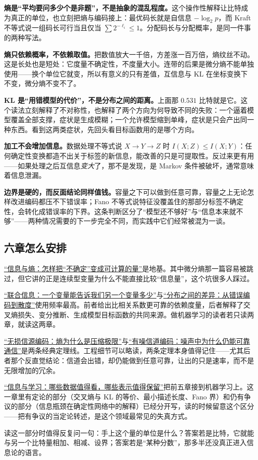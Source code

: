 \textbf{熵是``平均要问多少个是非题''，不是抽象的混乱程度。}这个操作性解释让比特成为真正的单位，也立刻把熵与编码接上：最优码长就是自信息 \(-\log_2p\)，而 Kraft 不等式说一组码长可行当且仅当 \(\sum2^{-\ell_i}\le1\)。分配码长与分配概率，是同一件事的两种写法。

\textbf{熵只依赖概率，不依赖取值。}把数值放大一千倍，方差涨一百万倍，熵纹丝不动。这是长处也是短处：它度量不确定性，不度量大小。连带的后果是微分熵不能单独使用——换个单位它就变，所以有意义的只有差值，互信息与 KL 在坐标变换下不变，微分熵不变不了。

\textbf{KL 是``用错模型的代价''，不是分布之间的距离。}上面那 \(0.531\) 比特就是它。这个读法立刻解释了不对称性，也解释了两个方向为何导致不同的失败：一个逼着模型覆盖全部支撑，症状是生成模糊；一个允许模型缩到单峰，症状是只会产出同一种东西。看到这两类症状，先回头看目标函数用的是哪个方向。

\textbf{加工不会增加信息。}数据处理不等式说 \(X\to Y\to Z\) 时 \(I(X;Z)\le I(X;Y)\)：任何确定性变换都造不出关于标签的新信息，能改善的只是可提取性。反过来更有用——如果处理之后互信息\emph{变大}了，那不是发现，是 Markov 条件被破坏，通常意味着信息泄漏。

\textbf{边界是硬的，而反面结论同样值钱。}容量之下可以做到任意可靠，容量之上无论怎样改进编码都压不下错误率；Fano 不等式说特征没覆盖住的那部分标签不确定性，会转化成错误率的下界。这条判断区分了``模型还不够好''与``信息本来就不够''——两种情况需要的下一步完全不同，而实践中它们经常被混为一谈。

\subsection{六章怎么安排}

\hyperref[ch:054]{``信息与熵：怎样把``不确定''变成可计算的量''}是地基。其中微分熵那一篇容易被跳过，但它讲的正是连续型变量为什么不能直接比较``信息量''，这个坑很多人踩过。

\hyperref[ch:055]{``联合信息：一个变量能告诉我们另一个变量多少''}与\hyperref[ch:056]{``分布之间的差异：从错误编码到散度''}使用频率最高。前者给出比相关系数更可靠的依赖度量，后者解释了交叉熵损失、变分推断、生成模型目标函数的共同来源。做机器学习的读者若只读两章，就读这两章。

\hyperref[ch:057]{``无损信源编码：熵为什么是压缩极限''}与\hyperref[ch:058]{``有噪信道编码：噪声中为什么仍能可靠通信''}是两条经典定理线。工程细节可以略读，两条定理本身值得记住——尤其后者那个反直觉结论：信道会出错，却仍能做到任意可靠，让出的只是速率，而不是无限增加的冗余。

\hyperref[ch:059]{``信息与学习：哪些数据值得看，哪些表示值得保留''}把前五章接到机器学习上。这一章里有定论的部分（交叉熵与 KL 的等价、最小描述长度、Fano 界）和仍有争议的部分（信息瓶颈在确定性网络中的解释）已经分开写，读的时候留意这个区分——把有争议的当定论转述，是这个领域最常见的失真方式。

读这一部分时值得反复问一句：手上这个量的单位是什么？答案若是比特，它就能与另一个比特量相加、相减、设界；答案若是``某种分数''，那多半还没真正进入信息论的语言。
